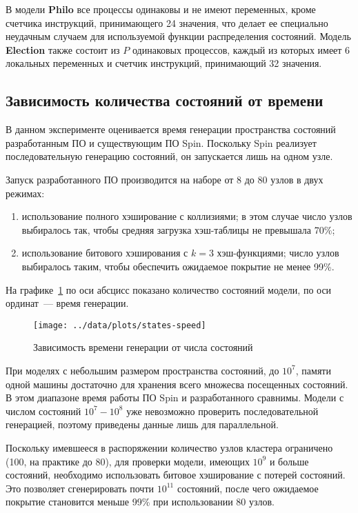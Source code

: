 \documentclass[12pt,a4paper,fleqn]{article}
\newcommand{\Code}[1]{\textbf{\mbox{#1}}}
\begin{document}
В модели \Code{Philo} все процессы одинаковы и не имеют переменных, кроме счетчика
инструкций, принимающего 24 значения, что делает ее специально неудачным случаем для
используемой функции распределения состояний. Модель \Code{Election} также состоит из $P$
одинаковых процессов, каждый из которых имеет 6 локальных переменных и счетчик инструкций,
принимающий 32 значения.

\subsection{Зависимость количества состояний от времени}

В данном эксперименте оценивается время генерации пространства состояний разработанным ПО
и существующим ПО Spin. Поскольку Spin реализует последовательную генерацию состояний, он
запускается лишь на одном узле.

Запуск разработанного ПО производится на наборе от 8 до 80 узлов в двух режимах:
\begin{enumerate}
\item использование полного хэширование с коллизиями; в этом случае число узлов выбиралось
  так, чтобы средняя загрузка хэш-таблицы не превышала 70\%;
\item использование битового хэширования с $k = 3$ хэш-функциями; число узлов выбиралось
  таким, чтобы обеспечить ожидаемое покрытие не менее 99\%.
\end{enumerate}

На графике~\ref{fig:states-speed} по оси абсцисс показано количество состояний модели, по
оси ординат~--- время генерации.

\begin{figure}[ht]
  \centering
  \texttt{[image: ../data/plots/states-speed]}
  \caption{Зависимость времени генерации от числа состояний}
  \label{fig:states-speed}
\end{figure}

При моделях с небольшим размером пространства состояний, до $10^7$, памяти одной машины
достаточно для хранения всего множесва посещенных состояний. В этом диапазоне время работы
ПО Spin и разработанного сравнимы. Модели с числом состояний $10^7-10^8$ уже невозможно
проверить последовательной генерацией, поэтому приведены данные лишь для
параллельной. 

Поскольку имевшееся в распоряжении количество узлов кластера ограничено (100, на практике
до 80), для проверки модели, имеющих $10^9$ и больше состояний, необходимо использовать
битовое хэширование с потерей состояний. Это позволяет сгенерировать почти $10^{11}$
состояний, после чего ожидаемое покрытие становится меньше 99\% при использовании 80
узлов.
\end{document}
